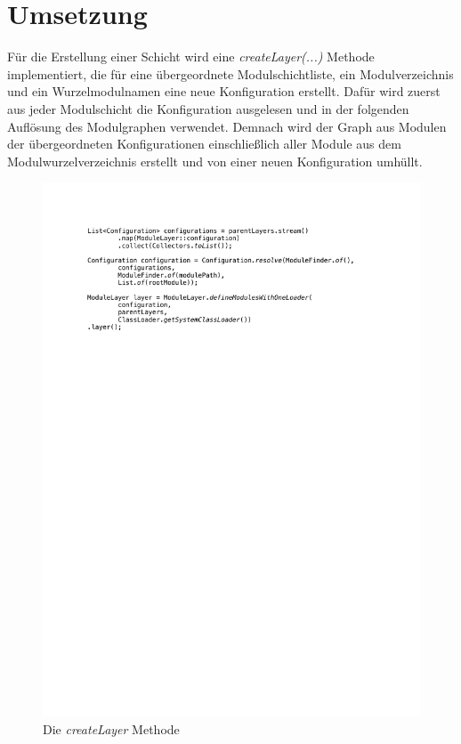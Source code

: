 \section{Umsetzung}\label{sec:umsetzung}
	Für die Erstellung einer Schicht wird eine \textit{createLayer(...)} Methode implementiert, die für eine übergeordnete Modulschichtliste, ein Modulverzeichnis und ein Wurzelmodulnamen eine neue Konfiguration erstellt. Dafür wird zuerst aus jeder Modulschicht die Konfiguration ausgelesen und in der folgenden Auflösung des Modulgraphen verwendet. Demnach wird der Graph aus Modulen der übergeordneten Konfigurationen einschließlich aller Module aus dem Modulwurzelverzeichnis erstellt und von einer neuen Konfiguration umhüllt.\bigbreak
	\begin{figure}[h!]
		   \centering
		   \captionsetup{justification=centering}
		   \includegraphics[width=\textwidth]{material/images/umsetzung/configs.pdf}
		   \caption{Die \textit{createLayer} Methode}
		   \label{fig:layerCreation}
	\end{figure}
